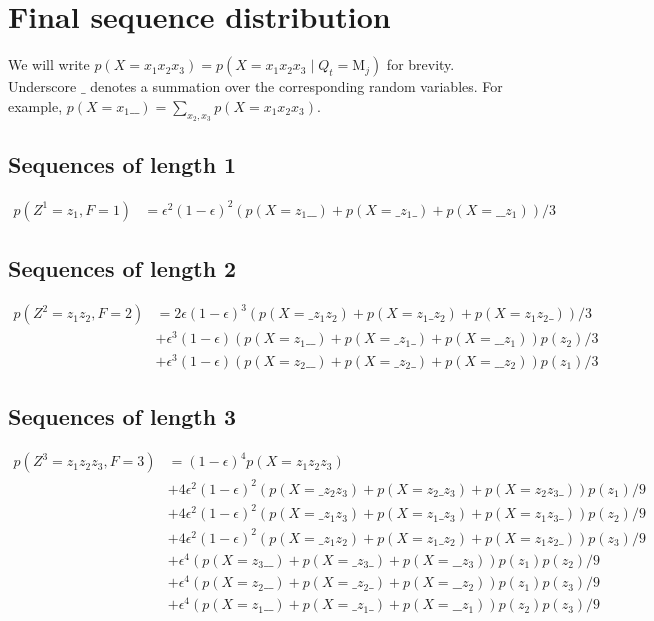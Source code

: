 \documentclass[a4paper]{article}
\theoremstyle{definition}
\theoremstyle{definition}
\theoremstyle{definition}
\newcommand{\eps}{\epsilon}
\newcommand{\s}{\texttt{\char`_}}
\newcommand{\gv}{\;|\;}
\begin{document}
\section{Final sequence distribution}

We will write $p(X=x_1x_2x_3) = p(X=x_1x_2x_3 \gv Q_t = \mathrm M_j)$ for brevity.
Underscore $\s$ denotes a summation over the corresponding random variables.
For example, $p(X=x_1\s\s)=\sum_{x_2,x_3}p(X=x_1x_2x_3)$.

\subsection{Sequences of length 1}

\begin{align*}
    p(Z^1=z_1,F=1)
        &= \eps^2(1-\eps)^2(p(X=z_1\s\s) + p(X=\s z_1\s) + p(X=\s\s z_1)) / 3
\end{align*}

\subsection{Sequences of length 2}

\begin{align*}
    p(Z^2=z_1z_2,F=2)
        &= 2\eps(1-\eps)^3(p(X=\s z_1z_2) + p(X=z_1\s z_2) + p(X=z_1z_2\s))/3\\
        &+ \eps^3(1-\eps)(p(X=z_1\s\s) + p(X=\s z_1\s) + p(X=\s\s z_1))p(z_2)/3\\
        &+ \eps^3(1-\eps)(p(X=z_2\s\s) + p(X=\s z_2\s) + p(X=\s\s z_2))p(z_1)/3
\end{align*}

\subsection{Sequences of length 3}

\begin{align*}
    p(Z^3=z_1z_2z_3,F=3) &= (1-\eps)^4 p(X=z_1z_2z_3)\\
        &+ 4\eps^2(1-\eps)^2 (p(X=\s z_2 z_3) + p(X=z_2\s z_3) + p(X=z_2 z_3\s))p(z_1)/9\\
        &+ 4\eps^2(1-\eps)^2 (p(X=\s z_1 z_3) + p(X=z_1\s z_3) + p(X=z_1 z_3\s))p(z_2)/9\\
        &+ 4\eps^2(1-\eps)^2 (p(X=\s z_1 z_2) + p(X=z_1\s z_2) + p(X=z_1 z_2\s))p(z_3)/9\\
        &+ \eps^4 (p(X=z_3\s\s) + p(X=\s z_3\s) + p(X=\s\s z_3))p(z_1)p(z_2)/9\\
        &+ \eps^4 (p(X=z_2\s\s) + p(X=\s z_2\s) + p(X=\s\s z_2))p(z_1)p(z_3)/9\\
        &+ \eps^4 (p(X=z_1\s\s) + p(X=\s z_1\s) + p(X=\s\s z_1))p(z_2)p(z_3)/9
\end{align*}
\end{document}
